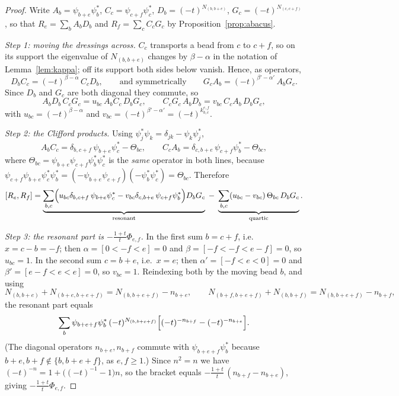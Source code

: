 \documentclass[11pt]{article}
\theoremstyle{definition}
\begin{document}
\begin{proof}
Write $A_b=\psi_{b+e}\psi_b^{*}$, $C_c=\psi_{c+f}\psi_c^{*}$,
$D_b=(-t)^{N_{(b,b+e)}}$, $G_c=(-t)^{N_{(c,c+f)}}$, so that
$R_e=\sum_bA_bD_b$ and $R_f=\sum_cC_cG_c$ by Proposition~\ref{prop:abacus}.

\emph{Step 1: moving the dressings across.}  $C_c$ transports a bead from $c$ to $c+f$,
so on its support the eigenvalue of $N_{(b,b+e)}$ changes by $\beta-\alpha$ in the
notation of Lemma~\ref{lem:kappa}; off its support both sides below vanish.  Hence, as
operators,
\[
  D_bC_c=(-t)^{\beta-\alpha}\,C_cD_b,\qquad\text{and symmetrically}\qquad
  G_cA_b=(-t)^{\beta'-\alpha'}\,A_bG_c .
\]
Since $D_b$ and $G_c$ are both diagonal they commute, so
\[
  A_bD_b\,C_cG_c=u_{bc}\,A_bC_c\,D_bG_c,\qquad
  C_cG_c\,A_bD_b=v_{bc}\,C_cA_b\,D_bG_c,
\]
with $u_{bc}=(-t)^{\beta-\alpha}$ and $v_{bc}=(-t)^{\beta'-\alpha'}=(-t)^{k^{e,f}_{b,c}}$.

\emph{Step 2: the Clifford products.}  Using $\psi_j^{*}\psi_k=\delta_{jk}-\psi_k\psi_j^{*}$,
\[
  A_bC_c=\delta_{b,c+f}\,\psi_{b+e}\psi_c^{*}-\Theta_{bc},\qquad
  C_cA_b=\delta_{c,b+e}\,\psi_{c+f}\psi_b^{*}-\Theta_{bc},
\]
where $\Theta_{bc}=\psi_{b+e}\psi_{c+f}\psi_b^{*}\psi_c^{*}$ is the \emph{same} operator in
both lines, because $\psi_{c+f}\psi_{b+e}\psi_c^{*}\psi_b^{*}
=(-\psi_{b+e}\psi_{c+f})(-\psi_b^{*}\psi_c^{*})=\Theta_{bc}$.  Therefore
\begin{equation}\label{eq:split}
 [R_e,R_f]=\underbrace{\sum_{b,c}\Bigl(u_{bc}\delta_{b,c+f}\,\psi_{b+e}\psi_c^{*}
   -v_{bc}\delta_{c,b+e}\,\psi_{c+f}\psi_b^{*}\Bigr)D_bG_c}_{\text{resonant}}
   \;-\;\underbrace{\sum_{b,c}(u_{bc}-v_{bc})\,\Theta_{bc}\,D_bG_c}_{\text{quartic}} .
\end{equation}

\emph{Step 3: the resonant part is $-\frac{1+t}{t}\Phi_{e,f}$.}  In the first sum
$b=c+f$, i.e.\ $x=c-b=-f$; then $\alpha=[0<-f<e]=0$ and $\beta=[-f<-f<e-f]=0$, so
$u_{bc}=1$.  In the second sum $c=b+e$, i.e.\ $x=e$; then $\alpha'=[-f<e<0]=0$ and
$\beta'=[e-f<e<e]=0$, so $v_{bc}=1$.  Reindexing both by the moving bead $b$, and using
\[
  N_{(b,b+e)}+N_{(b+e,b+e+f)}=N_{(b,b+e+f)}-n_{b+e},\qquad
  N_{(b+f,b+e+f)}+N_{(b,b+f)}=N_{(b,b+e+f)}-n_{b+f},
\]
the resonant part equals
\[
  \sum_b\psi_{b+e+f}\psi_b^{*}\,(-t)^{N_{(b,b+e+f)}}
     \Bigl[(-t)^{-n_{b+f}}-(-t)^{-n_{b+e}}\Bigr].
\]
(The diagonal operators $n_{b+e},n_{b+f}$ commute with $\psi_{b+e+f}\psi_b^{*}$ because
$b+e,b+f\notin\{b,b+e+f\}$, as $e,f\ge1$.)  Since $n^2=n$ we have
$(-t)^{-n}=1+\bigl((-t)^{-1}-1\bigr)n$, so the bracket equals
$-\frac{1+t}{t}\,(n_{b+f}-n_{b+e})$, giving $-\frac{1+t}{t}\Phi_{e,f}$.


\end{proof}
\end{document}
